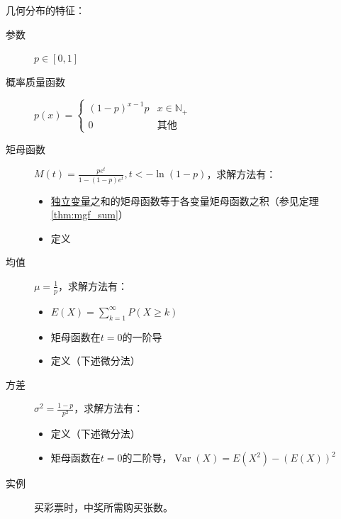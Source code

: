 几何分布的特征：
\begin{description}
    \item[参数] $p \in [0,1]$
    \item[概率质量函数] $p(x)=\begin{cases}
                (1-p)^{x-1} p & x \in \mathbb{N}_+ \\
                0             & \text{其他}
            \end{cases}$
    \item[矩母函数] $M(t)=\frac{p e^t}{1-(1-p)e^t}, t<-\ln (1-p)$，求解方法有：
        \begin{itemize}
            \item \underline{独立变量}之和的矩母函数等于各变量矩母函数之积（参见定理\ref{thm:mgf_sum}）
            \item 定义
        \end{itemize}
    \item[均值] $\mu=\frac{1}{p}$，求解方法有：
        \begin{itemize}
            \item $E(X)=\sum_{k=1}^{\infty}P(X\ge k)$
            \item 矩母函数在$t=0$的一阶导
            \item 定义（下述微分法）
        \end{itemize}
    \item[方差] $\sigma^2=\frac{1-p}{p^2}$，求解方法有：
        \begin{itemize}
            \item 定义（下述微分法）
            \item 矩母函数在$t=0$的二阶导，$\operatorname{Var}(X)=E(X^2)-(E(X))^2$
        \end{itemize}
    \item[实例] 买彩票时，中奖所需购买张数。
\end{description}

